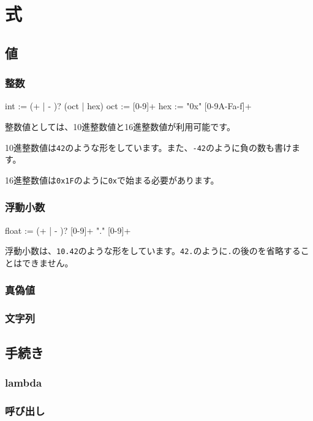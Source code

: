 \documentclass[draft]{article}
\begin{document}
\section{式}
\subsection{値}
\subsubsection{整数}

\begin{bnf}
int :=  (+ | - )? (oct | hex)
oct :=  [0-9]+
hex :=  "0x" [0-9A-Fa-f]+
\end{bnf}

整数値としては、10進整数値と16進整数値が利用可能です。

10進整数値は\verb!42!のような形をしています。また、\verb!-42!のように負の数も書けます。

16進整数値は\verb!0x1F!のように\verb!0x!で始まる必要があります。

\subsubsection{浮動小数}
\begin{bnf}
float :=  (+ | - )? [0-9]+ "." [0-9]+
\end{bnf}

浮動小数は、\verb!10.42!のような形をしています。\verb!42.!のように\verb!.!の後のを省略することはできません。

\subsubsection{真偽値}


\subsubsection{文字列}

\subsection{手続き}
\subsubsection{lambda}
\subsubsection{呼び出し}
\end{document}

